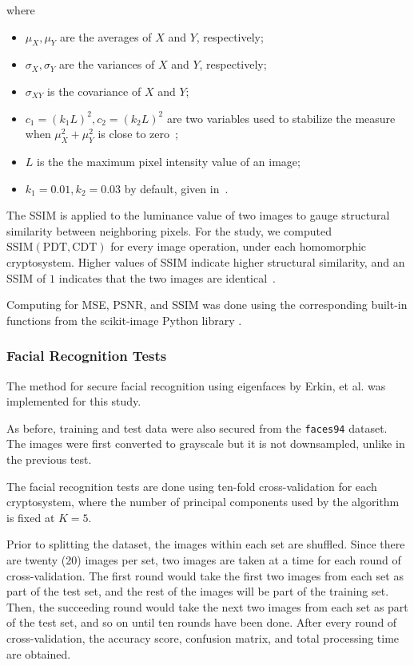 \begin{description}
	where
	\begin{itemize}
		\item $\mu_X, \mu_Y$ are the averages of $X$ and $Y$, respectively;
		\item $\sigma_X, \sigma_Y$ are the variances of $X$ and $Y$, respectively;
		\item $\sigma_{XY}$ is the covariance of $X$ and $Y$;
		\item $c_1 = (k_1L)^2, c_2 = (k_2L)^2$ are two variables used to stabilize the measure when $\mu_X^2+\mu_Y^2$ is close to zero~\cite{akramullah_video_2014};
		\item $L$ is the the maximum pixel intensity value of an image;
		\item $k_1 = 0.01, k_2 = 0.03$ by default, given in~\cite{ahmed_benchmark_2016}.
	\end{itemize}
	The SSIM is applied to the luminance value of two images to gauge structural similarity between neighboring pixels.
	For the study, we computed $\mathrm{SSIM}(\mathrm{PDT}, \mathrm{CDT})$ for every image operation, under each homomorphic cryptosystem. Higher values of SSIM indicate higher structural similarity, and an SSIM of $1$ indicates that the two images are identical~\cite{ahmed_benchmark_2016}.
\end{description}

Computing for MSE, PSNR, and SSIM was done using the corresponding built-in functions from the scikit-image Python library \cite{scikit-image}.

\subsubsection{Facial Recognition Tests}
The method for secure facial recognition using eigenfaces by Erkin, et al. \cite{hutchison_privacy-preserving_2009} was implemented for this study.

As before, training and test data were also secured from the \texttt{faces94} dataset. The images were first converted to grayscale but it is not downsampled, unlike in the previous test.

The facial recognition tests are done using ten-fold cross-validation for each cryptosystem, where the number of principal components used by the algorithm is fixed at $K=5$.

Prior to splitting the dataset, the images within each set are shuffled. Since there are twenty (20) images per set, two images are taken at a time for each round of cross-validation. The first round would take the first two images from each set as part of the test set, and the rest of the images will be part of the training set. Then, the succeeding round would take the next two images from each set as part of the test set, and so on until ten rounds have been done. After every round of cross-validation, the accuracy score, confusion matrix, and total processing time are obtained. 

